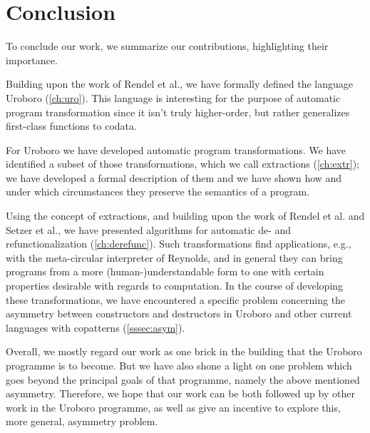 \chapter{Conclusion}
\label{ch:concl}

To conclude our work, we summarize our contributions, highlighting their importance.

Building upon the work of Rendel et al., we have formally defined the language Uroboro (\autoref{ch:uro}). This language is interesting for the purpose of automatic program transformation since it isn't truly higher-order, but rather generalizes first-class functions to codata.

For Uroboro we have developed automatic program transformations. We have identified a subset of those transformations, which we call extractions (\autoref{ch:extr}); we have developed a formal description of them and we have shown how and under which circumstances they preserve the semantics of a program.

Using the concept of extractions, and building upon the work of Rendel et al. and Setzer et al., we have presented algorithms for automatic de- and refunctionalization (\autoref{ch:derefunc}). Such transformations find applications, e.g., with the meta-circular interpreter of Reynolds, and in general they can bring programs from a more (human-)understandable form to one with certain properties desirable with regards to computation. In the course of developing these transformations, we have encountered a specific problem concerning the asymmetry between constructors and destructors in Uroboro and other current languages with copatterns (\autoref{sssec:asym}).

Overall, we mostly regard our work as one brick in the building that the Uroboro programme is to become. But we have also shone a light on one problem which goes beyond the principal goals of that programme, namely the above mentioned asymmetry. Therefore, we hope that our work can be both followed up by other work in the Uroboro programme, as well as give an incentive to explore this, more general, asymmetry problem.